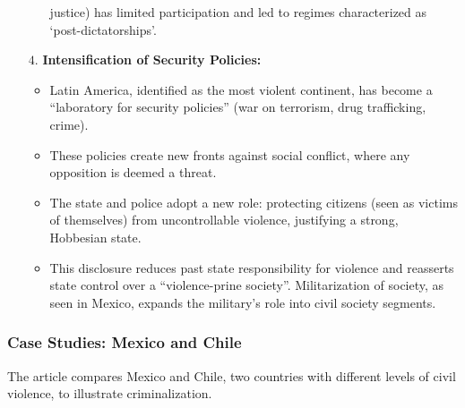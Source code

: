 \documentclass{article}
\begin{document}
\begin{itemize}
\begin{itemize}
            justice) has limited participation and led to regimes
            characterized as `post-dictatorships'.
        \end{itemize}
        \item[$4$.] \textbf{Intensification of Security Policies:}
        \begin{itemize}
            \item Latin America, identified as the most violent continent,
            has become a ``laboratory for security policies'' (war on
            terrorism, drug trafficking, crime).
            \item These policies create new fronts against social conflict,
            where any opposition is deemed a threat.
            \item The state and police adopt a new role: protecting
            citizens (seen as victims of themselves) from uncontrollable
            violence, justifying a strong, Hobbesian state.
            \item This disclosure reduces past state responsibility for
            violence and reasserts state control over a ``violence-prine
            society''. Militarization of society, as seen in Mexico, expands
            the military's role into civil society segments.
        \end{itemize}
    \end{itemize}

    \subsubsection{Case Studies: Mexico and Chile}

    \noindent The article compares Mexico and Chile, two countries with
different levels of civil violence, to illustrate criminalization.\\
\end{document}
